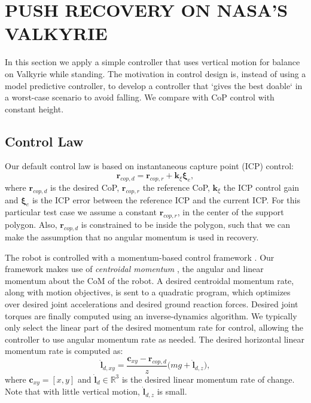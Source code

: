 \documentclass[letterpaper, 10 pt, conference]{ieeeconf}  %
\newcommand{\rcmpd}{\mathbf{r}_{cop,d}}
\newcommand{\rcmpr}{\mathbf{r}_{cop,r}}
\newcommand{\icpe}{\boldsymbol{\xi}_e}
\begin{document}
\section{PUSH RECOVERY ON NASA'S VALKYRIE}\label{sec:valkyrie}
In this section we apply a simple controller that uses vertical motion for balance on Valkyrie while standing. The motivation in control design is, instead of using a model predictive controller, to develop a controller that `gives the best doable` in a worst-case scenario to avoid falling. We compare with CoP control with constant height.
\subsection{Control Law}
Our default control law is based on instantaneous capture point (ICP) \cite{koolen2012capturability} control:
\begin{equation}
	\rcmpd = \rcmpr + \mathbf{k}_{\xi}\icpe,
\end{equation}
where $\rcmpd$ is the desired CoP, $\rcmpr$ the reference CoP, $\mathbf{k}_{\xi}$ the ICP control gain and $\icpe$ is the ICP error between the reference ICP and the current ICP. For this particular test case we assume a constant $\rcmpr$, in the center of the support polygon. Also, $\rcmpd$ is constrained to be inside the polygon, such that we can make the assumption that no angular momentum is used in recovery.

The robot is controlled with a momentum-based control framework \cite{koolen2016design}. Our framework makes use of \textit{centroidal momentum} \cite{orin2013centroidal}, the angular and linear momentum about the CoM of the robot. 
A desired centroidal momentum rate, along with motion objectives, is sent to a quadratic program, which optimizes over desired joint accelerations and desired ground reaction forces. Desired joint torques are finally computed using an inverse-dynamics algorithm. We typically only select the linear part of the desired momentum rate for control, allowing the controller to use angular momentum rate as needed. The desired horizontal linear momentum rate is computed as:
\begin{equation}
	\dot{\mathbf{l}}_{d,xy} = \frac{\mathbf{c}_{xy}-\rcmpd}{z}\big(mg + \dot{\mathbf{l}}_{d,z}\big),
\end{equation}
where $\mathbf{c}_{xy}=[x,y]$ and $\dot{\mathbf{l}}_{d} \in \mathbb{R}^3$ is the desired linear momentum rate of change. Note that with little vertical motion, $ \dot{\mathbf{l}}_{d,z}$ is small.
\end{document}
